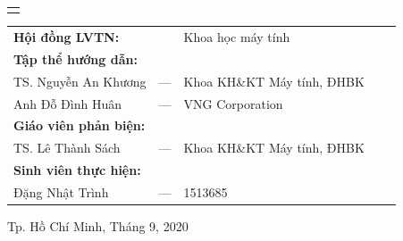 \documentclass[a4paper,13pt]{report}
\begin{document}
\begin{titlepage}
\begin{center}
\begin{tabular}{c}
\\
\hline
\\

\end{tabular}
\end{center}

\vspace{1cm}

\begin{tabular}{lllll}
\hspace{3 cm} \textbf{Hội đồng LVTN:}& &Khoa học máy tính\\\addlinespace

\hspace{3 cm} \textbf{Tập thể hướng dẫn:}\\\addlinespace
\hspace{4 cm} TS. Nguyễn An Khương &---& Khoa KH\&KT Máy tính, ĐHBK  \\
\hspace{4 cm} Anh Đỗ Đình Huân &---& VNG Corporation \\\addlinespace

\hspace{3 cm} \textbf{Giáo viên phản biện:}\\\addlinespace
\hspace{4 cm} TS. Lê Thành Sách &---& Khoa KH\&KT Máy tính, ĐHBK  \\\addlinespace

\hspace{3 cm} \textbf{Sinh viên thực hiện:} \\\addlinespace
\hspace{4 cm} Đặng Nhật Trình &---& 1513685 \\

\end{tabular}

\vspace{1.5cm}

\begin{center}
{\footnotesize Tp. Hồ Chí Minh, Tháng 9, 2020}
\end{center}
\end{titlepage}

\preface


% 
% 


\body
\printglossary[type=\acronymtype, title=Danh mục viết tắt, toctitle=Danh mục viết tắt]












\appendix


% 
% 
% 

\printbibliography
\end{document}
